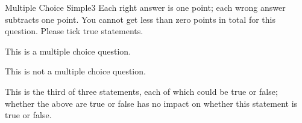 \begin{question-}{Multiple Choice Simple}{3}
Each right answer is one point; each wrong answer subtracts one point. You cannot get less than zero points in total for this question. Please tick true statements. 

\ticktrue This is a multiple choice question.

\tickfalse This is not a multiple choice question.

\ticktrue This is the third of three statements, each of which could be true or false; whether the above are true or false has no impact on whether this statement is true or false.

\end{question-}